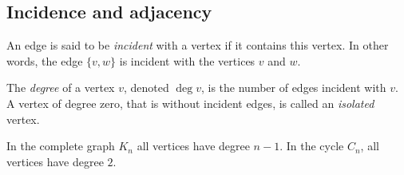 \subsection{Incidence and adjacency}
An edge is said to be \emph{incident} with a vertex if it contains this vertex.
In other words, the edge $\{v, w\}$ is incident with the vertices $v$ and $w$.

The \emph{degree} of a vertex $v$, denoted $\deg v$, is the number of edges incident with $v$.
A vertex of degree zero, that is without incident edges, is called an \emph{isolated} vertex.

In the complete graph $K_n$ all vertices have degree $n-1$.
In the cycle $C_n$, all vertices have degree $2$.

